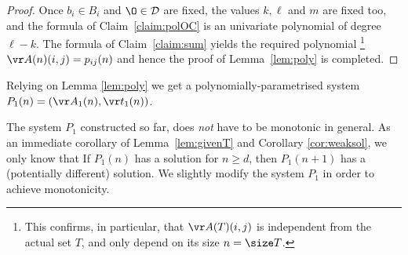 \begin{proof}
\smallskip

Once $b_i\in B_i$  and $\O\in\mathcal D$  
are fixed, the values $k, \ell$ and $m$ are fixed too, and
the formula of Claim~\ref{claim:polOC}
is an univariate polynomial of degree $\ell-k$.
%
%
%
%
The formula of  Claim~\ref{claim:sum} yields the required polynomial%
\footnote{
This confirms, in particular,  that $\vr A(T)(i,j)$ is independent from the actual set $T$, 
and only depend on its size $n=\size T$.}
 $\vr A(n)(i,j) = p_{ij}(n)$ and hence the proof of Lemma~\ref{lem:poly} is completed.
\end{proof}
%

Relying on Lemma \ref{lem:poly} we get a polynomially-parametrised system 
$P_1(n) = (\vr A_1(n), \vr t_1(n))$.

The system $P_1$ constructed so far, does \emph{not} have to be monotonic in general.
As an immediate corollary of Lemma~\ref{lem:givenT} and Corollary \ref{cor:weaksol}, we only know that
If $P_1(n)$ has a solution for $n\geq d$, then
$P_1(n+1)$ has a (potentially different) solution.
We slightly modify the system $P_1$
in order to achieve monotonicity.

